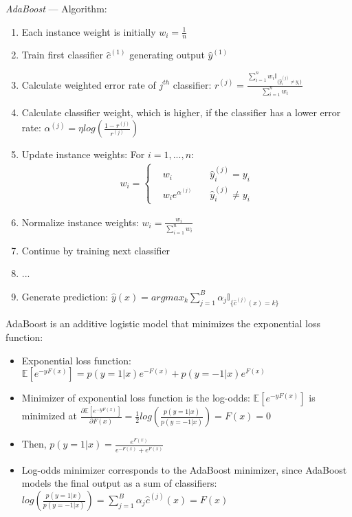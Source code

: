 \emph{AdaBoost} --- 
Algorithm:
\begin{enumerate}
    \item Each instance weight is initially $w_i = \frac{1}{n}$
    \item Train first classifier $\hat{c}^{(1)}$ generating output $\hat{y}^{(1)}$
    \item Calculate weighted error rate of $j^{th}$ classifier: $r^{(j)} = \frac{ \sum_{i=1}^n w_i \mathbb{I}_{\{ \hat{y}_i^{(j)} \neq y_i \}} }{ \sum_{i=1}^n w_i }$
    \item Calculate classifier weight, which is higher, if the classifier has a lower error rate: $\alpha^{(j)} = \eta log( \frac{1-r^{(j)}}{r^{(j)}} )$
    \item Update instance weights: For $i = 1, ..., n$: 
    \begin{align*}
    w_i = 
    \left\{
        \begin{aligned}
             & w_i \quad & \hat{y}_i^{(j)} = y_i \\
             & w_i e^{\alpha^{(j)}} \quad & \hat{y}_i^{(j)} \neq y_i
        \end{aligned}
    \right.
    \end{align*}
    \item Normalize instance weights: $w_i = \frac{w_i}{\sum_{i=1}^n w_i}$
    \item Continue by training next classifier
    \item ...
    \item Generate prediction: $\hat{y}(x) = argmax_k \sum_{j=1}^B \alpha_j \mathbb{I}_{\{ \hat{c}^{(j)}(x) = k \}}$
\end{enumerate}
AdaBoost is an additive logistic model that minimizes the exponential loss function:
\begin{itemize}
    \item Exponential loss function: $\mathbb{E} [ e^{-y F(x)} ] = p(y=1 | x) e^{-F(x)} + p(y=-1 | x) e^{F(x)}$
    \item Minimizer of exponential loss function is the log-odds: $\mathbb{E} [ e^{-y F(x)} ]$ is minimized at $\frac{ \partial \mathbb{E} [ e^{-y F(x)} ] }{ \partial F(x) } = \frac{1}{2} log ( \frac{ p(y=1 | x) }{ p(y=-1 | x) } ) = F(x) = 0 $
    \item Then, $p(y=1 | x) = \frac{ e^{F(x)} }{  e^{-F(x)} +  e^{F(x)} }$
    \item Log-odds minimizer corresponds to the AdaBoost minimizer, since AdaBoost models the final output as a sum of classifiers: $log ( \frac{ p(y=1 | x) }{ p(y=-1 | x) } ) = \sum_{j=1}^B \alpha_j \hat{c}^{(j)}(x) = F(x)$
\end{itemize}

